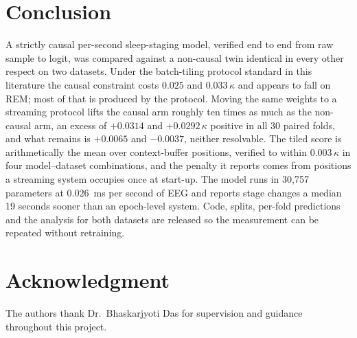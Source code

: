 \documentclass[conference]{IEEEtran}
\begin{document}
\section{Conclusion}

A strictly causal per-second sleep-staging model, verified end to end from raw sample to logit, was
compared against a non-causal twin identical in every other respect on two datasets. Under the
batch-tiling protocol standard in this literature the causal constraint costs $0.025$ and
$0.033\,\kappa$ and appears to fall on REM; most of that is produced by the protocol. Moving the
same weights to a streaming protocol lifts the causal arm roughly ten times as much as the
non-causal arm, an excess of $+0.0314$ and $+0.0292\,\kappa$ positive in all 30 paired folds, and
what remains is $+0.0065$ and $-0.0037$, neither resolvable. The tiled score is arithmetically the
mean over context-buffer positions, verified to within $0.003\,\kappa$ in four model--dataset
combinations, and the penalty it reports comes from positions a streaming system occupies once at
start-up. The model runs in 30{,}757 parameters at $0.026$~ms per second of EEG and reports stage
changes a median 19 seconds sooner than an epoch-level system. Code, splits, per-fold predictions
and the analysis for both datasets are released so the measurement can be repeated without
retraining.

\section*{Acknowledgment}

The authors thank Dr.\ Bhaskarjyoti Das for supervision and guidance throughout this project.
\end{document}
